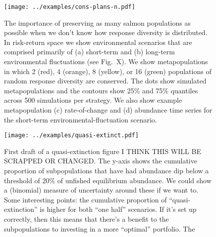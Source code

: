 \clearpage

\begin{figure}[htbp]
\centering
\texttt{[image: ../examples/cons-plans-n.pdf]}
\caption{The importance of preserving as many salmon populations as possible when we don't know how response diversity is distributed. In risk-return space we show environmental scenarios that are comprised primarily of (a) short-term and (b) long-term environmental fluctuations (see Fig.~X). We show metapopulations in which 2 (red), 4 (orange), 8 (yellow), or 16 (green) populations of random response diversity are conserved. The dots show simulated metapopulations and the contours show 25\% and 75\% quantiles across 500 simulations per strategy. We also show example metapopulation (c) rate-of-change and (d) abundance time series for the short-term environmental-fluctuation scenario.}
\label{f:n-mv}
\end{figure}

\clearpage

\begin{figure}[htbp]
\centering
\texttt{[image: ../examples/quasi-extinct.pdf]}
\caption{First draft of a quasi-extinction figure I THINK THIS WILL BE 
SCRAPPED OR CHANGED. The y-axis shows the cumulative proportion of 
subpopulations that have had abundance dip below a threshold of 20\% 
of unfished equilibrium abundance. We could show a (binomial) 
measure of uncertainty around these if we want to. Some interesting points: the 
cumulative proportion of ``quasi-extinction'' is higher for both ``one half'' 
scenarios. If it's set up correctly, then this means that there's a benefit to 
the subpopulations to investing in a more ``optimal'' portfolio. The }
\label{f:ext}
\end{figure}
